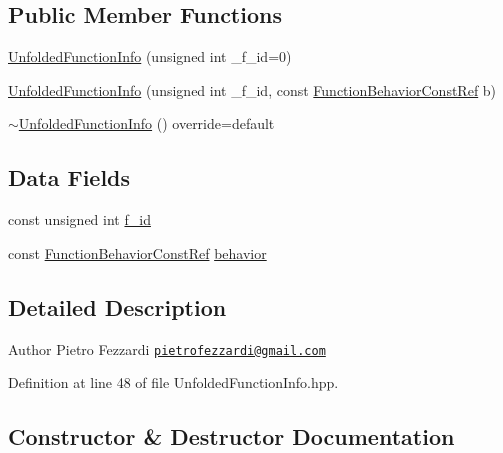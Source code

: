 \subsection*{Public Member Functions}
\begin{DoxyCompactItemize}
\item 
\hyperlink{classUnfoldedFunctionInfo_a67ff9950ea3a996c93dba6aef4870f3a}{Unfolded\+Function\+Info} (unsigned int \+\_\+f\+\_\+id=0)
\item 
\hyperlink{classUnfoldedFunctionInfo_a4c9c604772e8af984faeb4aac90f56bb}{Unfolded\+Function\+Info} (unsigned int \+\_\+f\+\_\+id, const \hyperlink{function__behavior_8hpp_a94872da12ed056b6ecf90456164e0213}{Function\+Behavior\+Const\+Ref} b)
\item 
\hyperlink{classUnfoldedFunctionInfo_acce69e265c0397a02368c8ccfb654d70}{$\sim$\+Unfolded\+Function\+Info} () override=default
\end{DoxyCompactItemize}
\subsection*{Data Fields}
\begin{DoxyCompactItemize}
\item 
const unsigned int \hyperlink{classUnfoldedFunctionInfo_a577d532d65638db644d68913567904fa}{f\+\_\+id}
\item 
const \hyperlink{function__behavior_8hpp_a94872da12ed056b6ecf90456164e0213}{Function\+Behavior\+Const\+Ref} \hyperlink{classUnfoldedFunctionInfo_a38c061b15269099ab396545f034a063f}{behavior}
\end{DoxyCompactItemize}


\subsection{Detailed Description}
\begin{DoxyAuthor}{Author}
Pietro Fezzardi \href{mailto:pietrofezzardi@gmail.com}{\tt pietrofezzardi@gmail.\+com} 
\end{DoxyAuthor}


Definition at line 48 of file Unfolded\+Function\+Info.\+hpp.



\subsection{Constructor \& Destructor Documentation}
\mbox{\label{classUnfoldedFunctionInfo_a67ff9950ea3a996c93dba6aef4870f3a}} 
